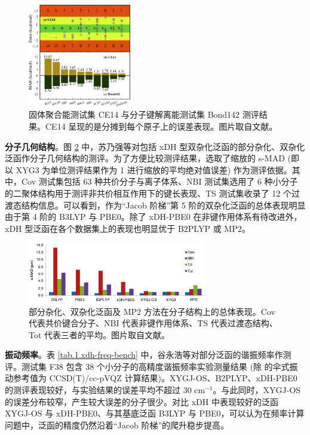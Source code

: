 \begin{figure}[h]
  \centering
  \includegraphics[width=0.4\textwidth]{assets/xdh-solid.jpeg}
  \caption{固体聚合能测试集 CE14 与分子键解离能测试集 Bond142 测评结果。CE14 呈现的是分摊到每个原子上的误差表现。图片取自文献\cite{Wang-Xu.JA.2021}。}
  \label{fig.1.xdh-solid}
\end{figure}

\textbf{分子几何结构}。图 \ref{fig.1.xdh-pbe0-bond} 中，苏乃强等对包括 xDH 型双杂化泛函的部分杂化、双杂化泛函作分子几何结构的测评\cite{Su-Xu.SCC.2013}。为了方便比较测评结果，选取了缩放的 s-MAD (即以 XYG3 为单位测评结果作为 1 进行缩放的平均绝对值误差) 作为测评依据。其中，Cov 测试集包括 63 种共价分子与离子体系、NBI 测试集选用了 6 种小分子的二聚体结构用于测评非共价相互作用下的键长表现、TS 测试集收录了 12 个过渡态结构信息。可以看到，作为“Jacob 阶梯”第 5 阶的双杂化泛函的总体表现明显由于第 4 阶的 B3LYP 与 PBE0。除了 xDH-PBE0 在非键作用体系有待改进外，xDH 型泛函在各个数据集上的表现也明显优于 B2PLYP 或 MP2。

\begin{figure}[h]
  \centering
  \includegraphics[width=0.7\textwidth]{assets/xdh-pbe0-bond.jpg}
  \caption{部分杂化、双杂化泛函及 MP2 方法在分子结构上的总体表现。Cov 代表共价键合分子、NBI 代表非键作用体系、TS 代表过渡态结构、Tot 代表三者的平均。图片取自文献\cite{Su-Xu.SCC.2013}。}
  \label{fig.1.xdh-pbe0-bond}
\end{figure}

\textbf{振动频率}。表 \ref{tab.1.xdh-freq-bench} 中，谷永浩等对部分泛函的谐振频率作测评\cite{Gu-Xu.JCTC.2021}。测试集 F38 包含 38 个小分子的高精度谐振频率实验测量结果 (除  的伞式振动参考值为 CCSD(T)/cc-pVQZ 计算结果)。XYGJ-OS、B2PLYP、xDH-PBE0 的测评表现较好，与实验结果的误差平均不超过 30 $\text{cm}^{-1}$。与此同时，XYGJ-OS 的误差分布较窄，产生较大误差的分子很少。对比 xDH 中表现较好的泛函 XYGJ-OS 与 xDH-PBE0、与其基底泛函 B3LYP 与 PBE0，可以认为在频率计算问题中，泛函的精度仍然沿着“Jacob 阶梯”的爬升稳步提高。

